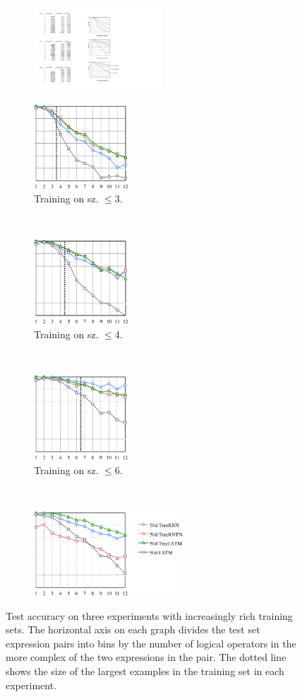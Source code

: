 \begin{figure}[t]
  \centering
  \begin{subfigure}[t]{0.04\textwidth}
      \includegraphics[height=1.25in]{scale.pdf}
\end{subfigure}
\begin{subfigure}[t]{0.24\textwidth}
  \includegraphics[height=1.25in]{fig3c.pdf}
  \caption{Training on sz. $\le$3.}
  \end{subfigure}~~~
\begin{subfigure}[t]{0.24\textwidth}
    \includegraphics[height=1.25in]{fig4c.pdf}
  \caption{Training on sz. $\le$4.}
  \end{subfigure}~~~
\begin{subfigure}[t]{0.24\textwidth}
      \includegraphics[height=1.25in]{fig6c.pdf}
  \caption{Training on sz. $\le$6.}
\end{subfigure}~~
\begin{subfigure}[t]{0.08\textwidth}
      \includegraphics[height=1.25in]{leg.pdf}
\end{subfigure}
  \caption{Test accuracy on three experiments with increasingly rich training sets. The horizontal axis on each graph divides the test set expression pairs into bins by the number of logical operators in the more complex of the two expressions in the pair. The dotted line shows the size of the largest examples in the training set in each experiment.}
  \label{prop-results} 
\end{figure}

